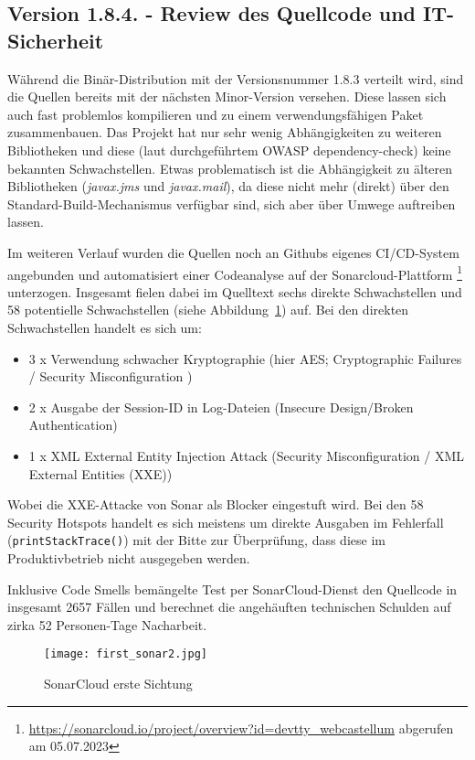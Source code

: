 \subsection{Version 1.8.4. - Review des Quellcode und IT-Sicherheit}
Während die Binär-Distribution mit der Versionsnummer 1.8.3 verteilt wird, sind die Quellen bereits mit der nächsten Minor-Version versehen. Diese lassen sich auch fast problemlos kompilieren und zu einem verwendungsfähigen Paket zusammenbauen. Das Projekt hat nur sehr wenig Abhängigkeiten zu weiteren Bibliotheken und diese (laut durchgeführtem OWASP dependency-check) keine bekannten Schwachstellen. Etwas problematisch ist die Abhängigkeit zu älteren Bibliotheken (\emph{javax.jms} und \emph{javax.mail}), da diese nicht mehr (direkt) über den Standard-Build-Mechanismus verfügbar sind, sich aber über Umwege auftreiben lassen.

Im weiteren Verlauf wurden die Quellen noch an Githubs eigenes CI/CD-System angebunden und automatisiert einer Codeanalyse auf der Sonarcloud-Plattform \footnote{\url{https://sonarcloud.io/project/overview?id=devtty_webcastellum} abgerufen am 05.07.2023} unterzogen. Insgesamt fielen dabei im Quelltext sechs direkte Schwachstellen und 58 potentielle Schwachstellen (siehe Abbildung~\ref{fig:my_sonar1}) auf. Bei den direkten Schwachstellen handelt es sich um:

\begin{itemize}
    \item 3 x Verwendung schwacher Kryptographie (hier AES; Cryptographic Failures / Security Misconfiguration )
    \item 2 x Ausgabe der Session-ID in Log-Dateien (Insecure Design/Broken Authentication)
    \item 1 x XML External Entity Injection Attack (Security Misconfiguration / XML External Entities (XXE))
\end{itemize}

Wobei die XXE-Attacke von Sonar als Blocker eingestuft wird. Bei den 58 Security Hotspots handelt es sich meistens um direkte Ausgaben im Fehlerfall (\verb=printStackTrace()=) mit der Bitte zur Überprüfung, dass diese im Produktivbetrieb nicht ausgegeben werden. 

Inklusive Code Smells bemängelte Test per SonarCloud-Dienst den Quellcode in insgesamt 2657 Fällen und berechnet die angehäuften technischen Schulden auf zirka 52 Personen-Tage Nacharbeit. 

\begin{figure}
    \centering
    \texttt{[image: first\_sonar2.jpg]}
    \caption{SonarCloud erste Sichtung}
    \label{fig:my_sonar1}
\end{figure}

